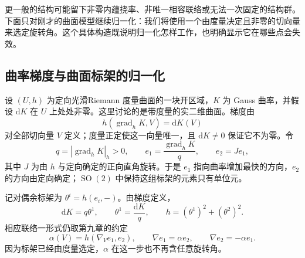 更一般的结构可能留下非零内蕴挠率、非唯一相容联络或无法一次固定的结构群。下面只对刚才的曲面模型继续归一化：我们将使用一个由度量决定且非零的切向量来选定旋转角。这个具体构造既说明归一化怎样工作，也明确显示它在哪些点会失效。

\subsection{曲率梯度与曲面标架的归一化}
\label{g1:subsec:D03:02}

设 \((U,h)\) 为定向光滑Riemann 度量曲面的一块开区域，\(K\) 为 Gauss 曲率，并假设 \(\mathrm{d}K\) 在 \(U\) 上处处非零。这里讨论的是带度量的实二维曲面。梯度由
\[
	h(\operatorname{grad}_h K,V)=\mathrm{d}K(V)
\]
对全部切向量 \(V\) 定义；度量正定使这一向量唯一，且 \(\mathrm{d}K\ne0\) 保证它不为零。令
\begin{equation}\label{g1:eq:curvature-gradient-frame}
	q=|\operatorname{grad}_h K|_h>0,\qquad
	e_1=\frac{\operatorname{grad}_h K}{q},\qquad e_2=Je_1,
\end{equation}
其中 \(J\) 为由 \(h\) 与定向确定的正向直角旋转。于是 \(e_1\) 指向曲率增加最快的方向，\(e_2\) 的方向由定向确定；\(\operatorname{SO}(2)\) 中保持这组标架的元素只有单位元。

\ProseParagraphBreak

记对偶余标架为 \(\theta^i=h(e_i,-)\)。由梯度定义，
\[
	\mathrm{d}K=q\theta^1,\qquad \theta^1=\frac{\mathrm{d}K}{q},
	\qquad h=(\theta^1)^2+(\theta^2)^2.
\]
相应联络一形式仍取第九章的约定
\[
	\alpha(V)=h(\nabla_Ve_1,e_2),\qquad
	\nabla e_1=\alpha e_2,\qquad \nabla e_2=-\alpha e_1.
\]
因为标架已经由度量选定，\(\alpha\) 在这一步也不再含任意旋转角。

